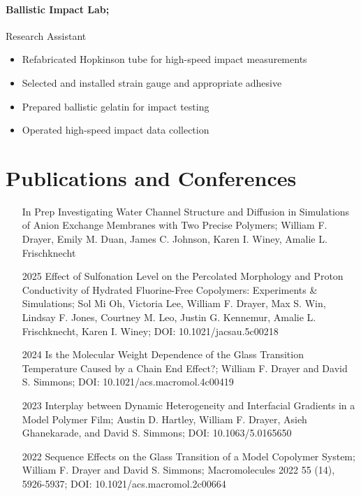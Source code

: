 \documentclass{my_cv}
\begin{document}
\paragraph{Ballistic Impact Lab;}
Research Assistant
\begin{itemize}
    \item Re\-fabricated Hopkins\-on tube for high-speed impact measurements
    \item Selected and installed strain gauge and appropriate adhesive
    \item Prepared ballistic gelatin for impact testing
    \item Operated high-speed impact data collection
\end{itemize}

\section{Publications and Conferences}
\begin{itemize}
    \item[In Prep] Investigating Water Channel Structure and Diffusion in Simulations of Anion Exchange Membranes with Two Precise Polymers; 
    William F. Drayer, Emily M. Duan, James C. Johnson, Karen I. Winey, Amalie L. Frischknecht
    \item[2025] Effect of Sulfonation Level on the Percolated Morphology and Proton Conductivity of Hydrated Fluorine-Free Copolymers: 
    Experiments \& Simulations; 
    Sol Mi Oh, Victoria Lee, William F. Drayer, Max S. Win, Lindsay F. Jones, Courtney M. Leo, Justin G. Kennemur, Amalie L. Frischknecht, Karen I. Winey;
    DOI: 10.1021/jacsau.5c00218
    \item[2024] Is the Molecular Weight Dependence of the Glass Transition Temperature Caused by a Chain End Effect?;
    William F. Drayer and David S. Simmons; DOI: 10.1021/acs.macromol.4c00419
    \item[2023] Interplay between Dynamic Heterogeneity and Inter\-facial Gradients in a Model Polymer Film; 
    Austin D. Hartley, William F. Drayer, Asieh Ghanekarade, and David S. Simmons; DOI: 10.1063/5.0165650
    \item[2022] Sequence Effects on the Glass Transition of a Model Co\-polymer System; 
    William F. Drayer and David S. Simmons; Macromolecules 2022 55 (14), 5926-5937; DOI: 10.1021/acs.macromol.2c00664
\end{itemize}
\end{document}
